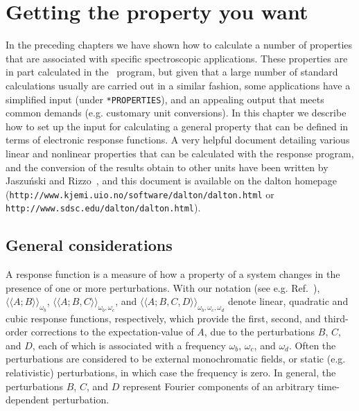 \chapter{Getting the property you want}\label{ch:rspchap}


In the preceding chapters we have shown how to calculate a number of
properties that are associated with specific spectroscopic applications.
These properties are in part
calculated in the \resp\ program, but given that a large number of
standard calculations usually are carried out in a similar fashion, some
applications have a simplified input (under {\tt **PROPERTIES}), 
and an appealing output that meets common demands 
(e.g. customary unit conversions). In this chapter we
describe how to set up the input for calculating a general property that
can be defined in terms of electronic response functions. A very
helpful document detailing various linear and nonlinear properties
that can be calculated with the response program, and the conversion
of the results obtain to other units have been written by
Jaszu\'{n}ski and Rizzo~\cite{}, and this document is available on the
dalton homepage
(\verb|http://www.kjemi.uio.no/software/dalton/dalton.html| or \verb|http://www.sdsc.edu/dalton/dalton.html|).

\section{General considerations}
\label{sec:rspgen}

\begin{center}
\end{center}

A response function is a measure of how a property of a system changes in
the presence of one or more perturbations. With our notation (see e.g.
Ref.~\cite{jopjjcp82}),  $\langle\!\langle A;B\rangle\!\rangle_{\omega_b}$,
$\langle\!\langle A;B,C\rangle\!\rangle_{\omega_b,\omega_c}$, and 
$\langle\!\langle A;B,C,D\rangle\!\rangle_{\omega_b,\omega_c,\omega_d}$
denote linear, quadratic and cubic response functions, respectively, which
provide the first, second, and third-order corrections to the
expectation-value of $A$, due to the perturbations $B$, $C$, and $D$, each of
which is associated with a frequency $\omega_b$, $\omega_c$, and
$\omega_d$. Often the perturbations are considered to be 
external monochromatic fields, or static (e.g. relativistic) perturbations,
in which case the frequency is zero.   In general, the perturbations $B$,
$C$, and $D$ represent Fourier components of an arbitrary time-dependent
perturbation.

